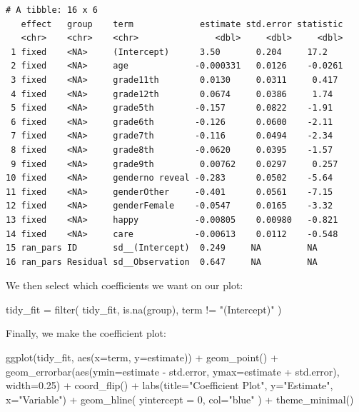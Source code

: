 \documentclass[
  letterpaper,
  DIV=11,
  numbers=noendperiod]{scrreprt}
\newenvironment{Shaded}{}{}
\newcommand{\AttributeTok}[1]{\textcolor[rgb]{0.49,0.56,0.16}{#1}}
\newcommand{\DecValTok}[1]{\textcolor[rgb]{0.25,0.63,0.44}{#1}}
\newcommand{\FloatTok}[1]{\textcolor[rgb]{0.25,0.63,0.44}{#1}}
\newcommand{\FunctionTok}[1]{\textcolor[rgb]{0.02,0.16,0.49}{#1}}
\newcommand{\NormalTok}[1]{#1}
\newcommand{\OtherTok}[1]{\textcolor[rgb]{0.00,0.44,0.13}{#1}}
\newcommand{\SpecialCharTok}[1]{\textcolor[rgb]{0.25,0.44,0.63}{#1}}
\newcommand{\StringTok}[1]{\textcolor[rgb]{0.25,0.44,0.63}{#1}}
\begin{document}
\begin{verbatim}
# A tibble: 16 x 6
   effect   group    term             estimate std.error statistic
   <chr>    <chr>    <chr>               <dbl>     <dbl>     <dbl>
 1 fixed    <NA>     (Intercept)      3.50       0.204     17.2   
 2 fixed    <NA>     age             -0.000331   0.0126    -0.0261
 3 fixed    <NA>     grade11th        0.0130     0.0311     0.417 
 4 fixed    <NA>     grade12th        0.0674     0.0386     1.74  
 5 fixed    <NA>     grade5th        -0.157      0.0822    -1.91  
 6 fixed    <NA>     grade6th        -0.126      0.0600    -2.11  
 7 fixed    <NA>     grade7th        -0.116      0.0494    -2.34  
 8 fixed    <NA>     grade8th        -0.0620     0.0395    -1.57  
 9 fixed    <NA>     grade9th         0.00762    0.0297     0.257 
10 fixed    <NA>     genderno reveal -0.283      0.0502    -5.64  
11 fixed    <NA>     genderOther     -0.401      0.0561    -7.15  
12 fixed    <NA>     genderFemale    -0.0547     0.0165    -3.32  
13 fixed    <NA>     happy           -0.00805    0.00980   -0.821 
14 fixed    <NA>     care            -0.00613    0.0112    -0.548 
15 ran_pars ID       sd__(Intercept)  0.249     NA         NA     
16 ran_pars Residual sd__Observation  0.647     NA         NA     
\end{verbatim}

We then select which coefficients we want on our plot:

\begin{Shaded}
\begin{Highlighting}[]
\NormalTok{tidy\_fit }\OtherTok{=} \FunctionTok{filter}\NormalTok{( tidy\_fit,}
                   \FunctionTok{is.na}\NormalTok{(group),}
\NormalTok{                   term }\SpecialCharTok{!=} \StringTok{"(Intercept)"}\NormalTok{ )}
\end{Highlighting}
\end{Shaded}

Finally, we make the coefficient plot:

\begin{Shaded}
\begin{Highlighting}[]
\FunctionTok{ggplot}\NormalTok{(tidy\_fit, }\FunctionTok{aes}\NormalTok{(}\AttributeTok{x=}\NormalTok{term, }\AttributeTok{y=}\NormalTok{estimate)) }\SpecialCharTok{+}
  \FunctionTok{geom\_point}\NormalTok{() }\SpecialCharTok{+}
  \FunctionTok{geom\_errorbar}\NormalTok{(}\FunctionTok{aes}\NormalTok{(}\AttributeTok{ymin=}\NormalTok{estimate }\SpecialCharTok{{-}}\NormalTok{ std.error, }\AttributeTok{ymax=}\NormalTok{estimate }\SpecialCharTok{+}\NormalTok{ std.error), }\AttributeTok{width=}\FloatTok{0.25}\NormalTok{) }\SpecialCharTok{+}
  \FunctionTok{coord\_flip}\NormalTok{() }\SpecialCharTok{+}
  \FunctionTok{labs}\NormalTok{(}\AttributeTok{title=}\StringTok{"Coefficient Plot"}\NormalTok{, }\AttributeTok{y=}\StringTok{"Estimate"}\NormalTok{, }\AttributeTok{x=}\StringTok{"Variable"}\NormalTok{) }\SpecialCharTok{+}
  \FunctionTok{geom\_hline}\NormalTok{( }\AttributeTok{yintercept =} \DecValTok{0}\NormalTok{, }\AttributeTok{col=}\StringTok{"blue"}\NormalTok{ ) }\SpecialCharTok{+}
  \FunctionTok{theme\_minimal}\NormalTok{()}
\end{Highlighting}
\end{Shaded}
\end{document}
